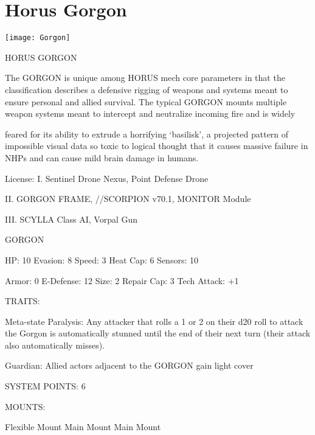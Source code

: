 \section{Horus Gorgon}

\begin{center}
    \texttt{[image: Gorgon]}
\end{center}

                                              HORUS GORGON

The GORGON is unique among HORUS mech core parameters in that the classification describes a
defensive rigging of weapons and systems meant to ensure personal and allied survival. The typical
GORGON mounts multiple weapon systems meant to intercept and neutralize incoming fire and is widely

feared for its ability to extrude a horrifying ‘basilisk’, a projected pattern of impossible visual data so toxic to
logical thought that it causes massive failure in NHPs and can cause mild brain damage in humans.




                                                   License:
I. Sentinel Drone Nexus, Point Defense Drone

II. GORGON FRAME,  //SCORPION v70.1, MONITOR Module

III. SCYLLA Class AI, Vorpal Gun


                                                 GORGON

 HP: 10         Evasion: 8                            Speed: 3            Heat Cap: 6        Sensors: 10

 Armor: 0       E-Defense: 12                         Size: 2             Repair Cap: 3      Tech Attack:
                                                                                             +1

                                                   TRAITS:

 Meta-state Paralysis: Any attacker that rolls a 1 or 2 on their d20 roll to attack the Gorgon is
 automatically stunned until the end of their next turn (their attack also automatically misses).

 Guardian: Allied actors adjacent to the GORGON gain light cover

                                             SYSTEM POINTS: 6

                                                  MOUNTS:

 Flexible Mount                    Main Mount                             Main Mount


